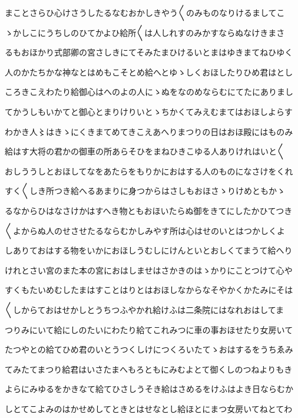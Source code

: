 \documentclass[a4paper,11pt,landscape]{ltjtarticle}
\begin{document}
\par\medskip
まことさらひ心けさうしたるなむおかしきやう〱のみものなりけるましてこ
\par\medskip
ゝかしこにうちしのひてかよひ給所〱は人しれすのみかすならぬなけきまさ
\par\medskip
るもおほかり式部卿の宮さしきにてそみたまひけるいとまはゆきまてねひゆく
\par\medskip
人のかたちかな神なとはめもこそとめ給へとゆゝしくおほしたりひめ君はとし
\par\medskip
ころきこえわたり給御心はへのよの人にゝぬをなのめならむにてたにありまし
\par\medskip
てかうしもいかてと御心とまりけりいとゝちかくてみえむまてはおほしよらす
\par\medskip
わかき人〻はきゝにくきまてめてきこえあへりまつりの日はおほ殿にはものみ
\par\medskip
給はす大将の君かの御車の所あらそひをまねひきこゆる人ありけれはいと〱
\par\medskip
おしううしとおほしてなをあたらをもりかにおはする人のものになさけをくれ
\par\medskip
すく〱しき所つき給へるあまりに身つからはさしもおほさゝりけめともかゝ
\par\medskip
るなからひはなさけかはすへき物ともおほいたらぬ御をきてにしたかひてつき
\par\medskip
〱よからぬ人のせさせたるならむかしみやす所は心はせのいとはつかしくよ
\par\medskip
しありておはする物をいかにおほしうむしにけんといとおしくてまうて給へり
\par\medskip
けれとさい宮のまた本の宮におはしませはさかきのはゝかりにことつけて心や
\par\medskip
すくもたいめむしたまはすことはりとはおほしなからなそやかくかたみにそは
\par\medskip
〱しからておはせかしとうちつふやかれ給けふは二条院にはなれおはしてま
\par\medskip
つりみにいて給にしのたいにわたり給てこれみつに車の事おほせたり女房いて
\par\medskip
たつやとの給てひめ君のいとうつくしけにつくろいたてゝおはするをうちゑみ
\par\medskip
てみたてまつり給君はいさたまへもろともにみむよとて御くしのつねよりもき
\par\medskip
よらにみゆるをかきなて給てひさしうそき給はさめるをけふはよき日ならむか
\par\medskip
しとてこよみのはかせめしてときとはせなとし給ほとにまつ女房いてねとてわ
\par\medskip
\end{document}
